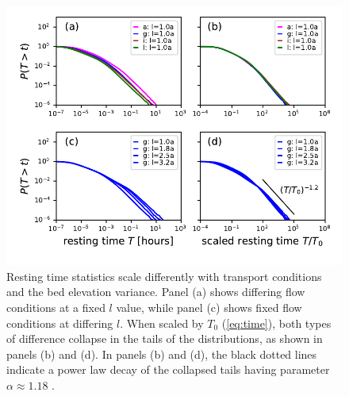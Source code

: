 \documentclass[draft]{agujournal2018}
\begin{document}
\begin{figure}[!ht]
	\includegraphics[width=\linewidth,keepaspectratio]{rtcdf.pdf}
	\caption{Resting time statistics scale differently with transport conditions and the bed elevation variance. Panel (a) shows differing flow conditions at a fixed $l$ value, while panel (c) shows fixed flow conditions at differing $l$. When scaled by $T_0$ (\ref{eq:time}), both types of difference collapse in the tails of the distributions, as shown in panels (b) and (d). In panels (b) and (d), the black dotted lines indicate a power law decay of the collapsed tails having parameter $\alpha\approx1.18$ .}
	\label{fig:cdfs}
\end{figure}
\end{document}
